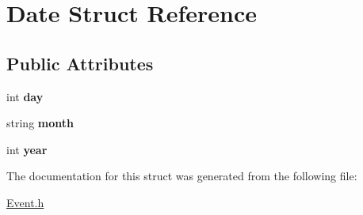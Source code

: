 \hypertarget{struct_date}{}\section{Date Struct Reference}
\label{struct_date}
\subsection*{Public Attributes}
\begin{DoxyCompactItemize}
\item 
int {\bfseries day}\hypertarget{struct_date_a5b192adcabf2b2871e3f0b76c1ec1601}{}\label{struct_date_a5b192adcabf2b2871e3f0b76c1ec1601}

\item 
string {\bfseries month}\hypertarget{struct_date_a90d5c3971e7bcf73d47bdd986964905e}{}\label{struct_date_a90d5c3971e7bcf73d47bdd986964905e}

\item 
int {\bfseries year}\hypertarget{struct_date_a3eeced2ed56bc95d56782b9e738db8ea}{}\label{struct_date_a3eeced2ed56bc95d56782b9e738db8ea}

\end{DoxyCompactItemize}


The documentation for this struct was generated from the following file\+:\begin{DoxyCompactItemize}
\item 
\hyperlink{_event_8h}{Event.\+h}\end{DoxyCompactItemize}
